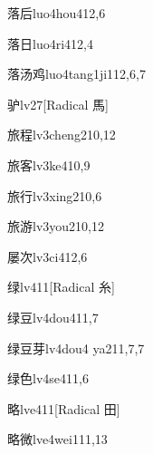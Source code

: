 \begin{verbete}{落后}{luo4hou4}{12,6}
\end{verbete}

\begin{verbete}{落日}{luo4ri4}{12,4}
\end{verbete}

\begin{verbete}{落汤鸡}{luo4tang1ji1}{12,6,7}
\end{verbete}

\begin{verbete}{驴}{lv2}{7}[Radical 馬]
\end{verbete}

\begin{verbete}{旅程}{lv3cheng2}{10,12}
\end{verbete}

\begin{verbete}{旅客}{lv3ke4}{10,9}
\end{verbete}

\begin{verbete}{旅行}{lv3xing2}{10,6}
\end{verbete}

\begin{verbete}{旅游}{lv3you2}{10,12}
\end{verbete}

\begin{verbete}{屡次}{lv3ci4}{12,6}
\end{verbete}

\begin{verbete}{绿}{lv4}{11}[Radical 糸]
\end{verbete}

\begin{verbete}{绿豆}{lv4dou4}{11,7}
\end{verbete}

\begin{verbete}{绿豆芽}{lv4dou4 ya2}{11,7,7}
\end{verbete}

\begin{verbete}{绿色}{lv4se4}{11,6}
\end{verbete}

\begin{verbete}{略}{lve4}{11}[Radical 田]
\end{verbete}

\begin{verbete}{略微}{lve4wei1}{11,13}
\end{verbete}

